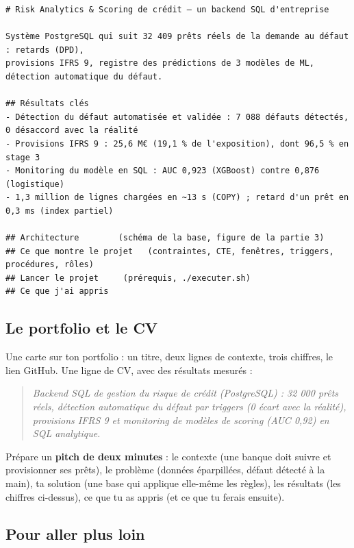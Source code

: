 \begin{lstlisting}[style=sortie]
# Risk Analytics & Scoring de crédit — un backend SQL d'entreprise

Système PostgreSQL qui suit 32 409 prêts réels de la demande au défaut : retards (DPD),
provisions IFRS 9, registre des prédictions de 3 modèles de ML, détection automatique du défaut.

## Résultats clés
- Détection du défaut automatisée et validée : 7 088 défauts détectés, 0 désaccord avec la réalité
- Provisions IFRS 9 : 25,6 M€ (19,1 % de l'exposition), dont 96,5 % en stage 3
- Monitoring du modèle en SQL : AUC 0,923 (XGBoost) contre 0,876 (logistique)
- 1,3 million de lignes chargées en ~13 s (COPY) ; retard d'un prêt en 0,3 ms (index partiel)

## Architecture        (schéma de la base, figure de la partie 3)
## Ce que montre le projet   (contraintes, CTE, fenêtres, triggers, procédures, rôles)
## Lancer le projet     (prérequis, ./executer.sh)
## Ce que j'ai appris
\end{lstlisting}

\subsection{Le portfolio et le CV}

\begin{itemize}[label={}, leftmargin=1.2em]
\tache Une carte sur ton portfolio : un titre, deux lignes de contexte, trois chiffres, le lien GitHub.
\tache Une ligne de CV, avec des résultats mesurés :
\begin{quote}\itshape
Backend SQL de gestion du risque de crédit (PostgreSQL) : 32 000 prêts réels, détection automatique du
défaut par triggers (0 écart avec la réalité), provisions IFRS 9 et monitoring de modèles de scoring
(AUC 0,92) en SQL analytique.
\end{quote}
\tache Prépare un \textbf{pitch de deux minutes} : le contexte (une banque doit suivre et provisionner ses
prêts), le problème (données éparpillées, défaut détecté à la main), ta solution (une base qui applique
elle-même les règles), les résultats (les chiffres ci-dessus), ce que tu as appris (et ce que tu
ferais ensuite).
\end{itemize}

\subsection{Pour aller plus loin}

